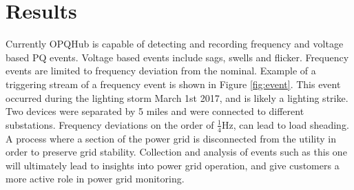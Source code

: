 \documentclass[a4paper, conference]{IEEEtran}
\begin{document}
\section{Results}

Currently OPQHub is capable of detecting and recording frequency and 
voltage based PQ events. Voltage based events include sags, swells and flicker.
Frequency events are limited to frequency deviation from the nominal. Example of a triggering stream of a frequency event is shown in Figure \ref{fig:event}. This event occurred during the lighting storm March 1st 2017, and is likely a lighting strike. Two devices were separated by 5 miles and were connected to different substations. 
Frequency deviations on the order of $\frac{1}{4}$Hz, can lead to load sheading.\cite{GE_LS} A process where a section of the power grid is disconnected from the utility in order to preserve grid stability. Collection and analysis of events such as this one will ultimately lead to insights into power grid operation, and give customers a more active role in power grid monitoring.
%



%
%





\end{document}
